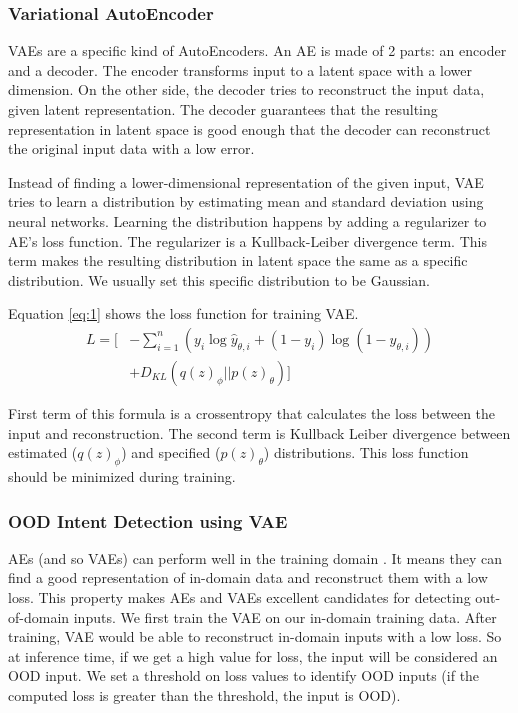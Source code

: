 \documentclass{article}
\begin{document}
\subsubsection{Variational AutoEncoder}
VAEs are a specific kind of AutoEncoders.
An AE is made of 2 parts: an encoder and a decoder.
The encoder transforms input to a latent space with a lower dimension.
On the other side, the decoder tries to reconstruct the input data, given latent representation.
The decoder guarantees that the resulting representation in latent space is good enough that the decoder can reconstruct the original input data with a low error.

Instead of finding a lower-dimensional representation of the given input,
VAE tries to learn a distribution by estimating mean and standard deviation using neural networks.
Learning the distribution happens by adding a regularizer to AE's loss function.
The regularizer is a Kullback-Leiber divergence term.
This term makes the resulting distribution in latent space the same as a specific distribution.
We usually set this specific distribution to be Gaussian.

Equation \ref{eq:1} shows the loss function for training VAE.
\begin{equation}
  \begin{aligned}
    L = \bigg[ & - \sum_{i=1}^{n} (y_{i}\log\hat{y}_{\theta,i} + (1 - y_{i})\log(1 - \hat{y}_{\theta,i})) \\
    & + D_{KL}(q(z)_{\phi} || p(z)_{\theta})\bigg] \label{eq:1}
  \end{aligned}
\end{equation} 

First term of this formula is a crossentropy that calculates the loss between the input and reconstruction.
The second term is Kullback Leiber divergence between estimated ($q(z)_{\phi}$) and specified ($p(z)_{\theta}$) distributions.
This loss function should be minimized during training.

\subsubsection{OOD Intent Detection using VAE}

AEs (and so VAEs) can perform well in the training domain \citep{noroozi2016unsupervised,NIPS2015_aa169b49}.
It means they can find a good representation of in-domain data and reconstruct them with a low loss.
This property makes AEs and VAEs excellent candidates for detecting out-of-domain inputs.
We first train the VAE on our in-domain training data.
After training, VAE would be able to reconstruct in-domain inputs with a low loss.
So at inference time, if we get a high value for loss, the input will be considered an OOD input.
We set a threshold on loss values to identify OOD inputs
(if the computed loss is greater than the threshold, the input is OOD).
\end{document}
